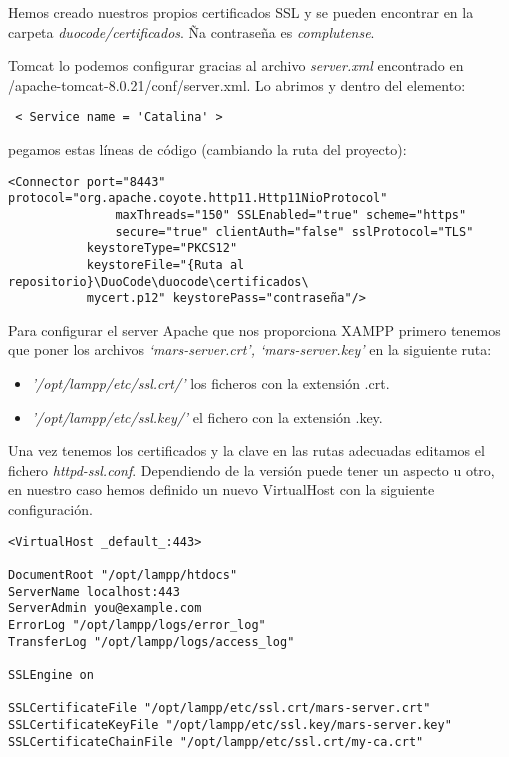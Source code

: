 \begin{itemize}
Hemos creado nuestros propios certificados SSL y se pueden encontrar en la carpeta \textit{duocode/certificados}. Ña contraseña es \textit{complutense}.

Tomcat lo podemos configurar gracias al archivo \textit{server.xml} encontrado en /apache-tomcat-8.0.21/conf/server.xml.
Lo abrimos y dentro del elemento:
{\codesize
\begin{verbatim}
 < Service name = 'Catalina' >  
\end{verbatim}
}
pegamos estas líneas de código (cambiando la ruta del proyecto):

{\codesize
\begin{verbatim}
<Connector port="8443" protocol="org.apache.coyote.http11.Http11NioProtocol"
               maxThreads="150" SSLEnabled="true" scheme="https" 
               secure="true" clientAuth="false" sslProtocol="TLS"
           keystoreType="PKCS12"
           keystoreFile="{Ruta al repositorio}\DuoCode\duocode\certificados\
           mycert.p12" keystorePass="contraseña"/>
\end{verbatim}
}

Para configurar el server Apache que nos proporciona XAMPP primero tenemos que poner los archivos \textit{`mars-server.crt', `mars-server.key'} en la siguiente ruta:

\begin{itemize}


\item \textit{'/opt/lampp/etc/ssl.crt/'} los ficheros con la extensión .crt.

\item \textit{'/opt/lampp/etc/ssl.key/'} el fichero con la extensión .key.

\end{itemize}

Una vez tenemos los certificados y la clave en las rutas adecuadas editamos el fichero \textit{httpd-ssl.conf}. Dependiendo de la versión puede tener un aspecto u otro, en nuestro caso hemos definido un nuevo VirtualHost con la siguiente configuración.

{\codesize
\begin{verbatim}
<VirtualHost _default_:443>

DocumentRoot "/opt/lampp/htdocs"
ServerName localhost:443
ServerAdmin you@example.com
ErrorLog "/opt/lampp/logs/error_log"
TransferLog "/opt/lampp/logs/access_log"

SSLEngine on

SSLCertificateFile "/opt/lampp/etc/ssl.crt/mars-server.crt"
SSLCertificateKeyFile "/opt/lampp/etc/ssl.key/mars-server.key"
SSLCertificateChainFile "/opt/lampp/etc/ssl.crt/my-ca.crt"


\end{verbatim}}
\end{itemize}
